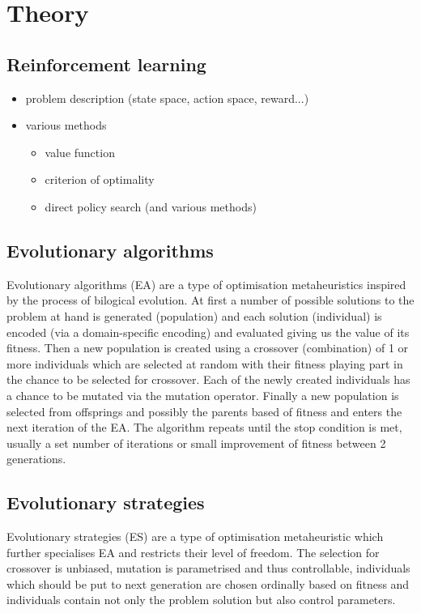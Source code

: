 \chapter{Theory}
\label{chap:theory}

\section{Reinforcement learning}
\label{sec:reinf}
\begin{itemize}
    \item problem description (state space, action space, reward...)
    \item various methods \begin{itemize}
        \item value function
        \item criterion of optimality
        \item direct policy search (and various methods)
    \end{itemize}
\end{itemize}
\section{Evolutionary algorithms}
\label{sec:ea}
Evolutionary algorithms (EA) are a type of optimisation metaheuristics inspired by the process of bilogical evolution. At first a number of possible solutions to the problem at hand is generated (population) and each solution (individual) is encoded (via a domain-specific encoding) and evaluated giving us the value of its fitness. Then a new population is created using a crossover (combination) of 1 or more individuals which are selected at random with their fitness playing part in the chance to be selected for crossover. Each of the newly created individuals has a chance to be mutated via the mutation operator. Finally a new population is selected from offsprings and possibly the parents based of fitness and enters the next iteration of the EA. The algorithm repeats until the stop condition is met, usually a set number of iterations or small improvement of fitness between 2 generations. \cite{Rudolph2012} \cite{Vikhar2016} 
\section{Evolutionary strategies}
\label{sec:es}
Evolutionary strategies (ES) are a type of optimisation metaheuristic which further specialises EA and restricts their level of freedom. The selection for crossover is unbiased, mutation is parametrised and thus controllable, individuals which should be put to next generation are chosen ordinally based on fitness and individuals contain not only the problem solution but also control parameters.

